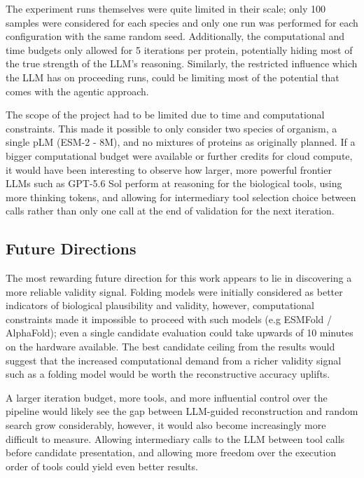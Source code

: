 \documentclass[journal]{IEEEtran}
\begin{document}
The experiment runs themselves were quite limited in their scale; only 100 samples were considered for
each species and only one run was performed for each configuration with the same random seed. Additionally,
the computational and time budgets only allowed for 5 iterations per protein, potentially hiding most of
the true strength of the LLM's reasoning. Similarly, the restricted influence which the LLM has on proceeding runs, 
could be limiting most of the potential that comes with the agentic approach.

The scope of the project had to be limited due to time and computational constraints. This made it possible to only consider 
two species of organism, a single pLM (ESM-2 - 8M), and no mixtures of proteins as originally planned. If a bigger computational
budget were available or further credits for cloud compute, it would have been interesting to observe how larger, more powerful
frontier LLMs such as GPT-5.6 Sol perform at reasoning for the biological tools, using more thinking tokens, and allowing for intermediary
tool selection choice between calls rather than only one call at the end of validation for the next iteration.

\subsection{Future Directions}

The most rewarding future direction for this work appears to lie in discovering a more reliable validity signal.
Folding models were initially considered as better indicators of biological plausibility and validity, 
however, computational constraints made it impossible to proceed with such models (e.g ESMFold / AlphaFold);
even a single candidate evaluation could take upwards of 10 minutes on the hardware available.
The best candidate ceiling from the results would suggest that the increased computational 
demand from a richer validity signal
such as a folding model would be worth the reconstructive accuracy uplifts.

A larger iteration budget, more tools, and more influential control over the pipeline would likely see the gap between
LLM-guided reconstruction and random search grow considerably, however, it would also become increasingly more
difficult to measure. Allowing intermediary calls to the LLM between tool calls before candidate presentation, and
allowing more freedom over the execution order of tools could yield even better results.
\end{document}
